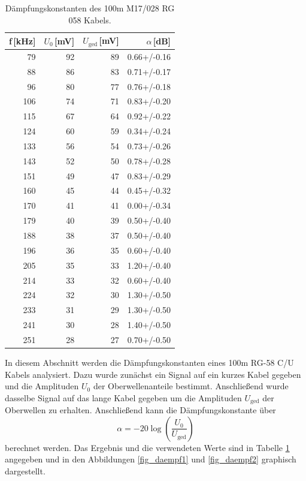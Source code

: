 \begin{table}
\centering
	\caption[]{Dämpfungskonstanten des 100m M17/028 RG 058 Kabels.}
	\begin{tabular}{r r r r}
		f\,[kHz] & $U_0$\,[mV] & $U_\text{ged}$\,[mV] & $\alpha$\,[dB]\\
		\hline \hline
			79	&	92	&	89	&	0.66+/-0.16 \\
			88	&	86	&	83	&	0.71+/-0.17 \\
			96	&	80	&	77	&	0.76+/-0.18 \\
			106	&	74	&	71	&	0.83+/-0.20 \\
			115	&	67	&	64	&	0.92+/-0.22 \\
			124	&	60	&	59	&	0.34+/-0.24 \\
			133	&	56	&	54	&	0.73+/-0.26 \\
			143	&	52	&	50	&	0.78+/-0.28 \\
			151	&	49	&	47	&	0.83+/-0.29 \\
			160	&	45	&	44	&	0.45+/-0.32 \\
			170	&	41	&	41	&	0.00+/-0.34 \\
			179	&	40	&	39	&	0.50+/-0.40 \\
			188	&	38	&	37	&	0.50+/-0.40 \\
			196	&	36	&	35	&	0.60+/-0.40 \\
			205	&	35	&	33	&	1.20+/-0.40 \\
			214	&	33	&	32	&	0.60+/-0.40 \\
			224	&	32	&	30	&	1.30+/-0.50 \\
			233	&	31	&	29	&	1.30+/-0.50 \\
			241	&	30	&	28	&	1.40+/-0.50 \\
			251	&	28	&	27	&	0.70+/-0.50\\
			\hline
	\end{tabular}
	\label{tab_daempf}
\end{table}

In diesem Abschnitt werden die Dämpfungskonstanten eines 100m RG-58 C/U Kabels analysiert.
Dazu wurde zunächst ein Signal auf ein kurzes Kabel gegeben und die Amplituden $U_0$ der Oberwellenanteile bestimmt.
Anschließend wurde dasselbe Signal auf das lange Kabel gegeben um die Amplituden $U_\text{ged}$ der Oberwellen zu erhalten.
Anschließend kann die Dämpfungskonstante über
\begin{equation}
	\alpha = -20 \log \left( \frac{U_0}{U_\text{ged}}\right)
\end{equation}
berechnet werden.
Das Ergebnis und die verwendeten Werte sind in Tabelle \ref{tab_daempf} angegeben und in den Abbildungen \ref{fig_daempf1} und \ref{fig_daempf2} graphisch dargestellt.

